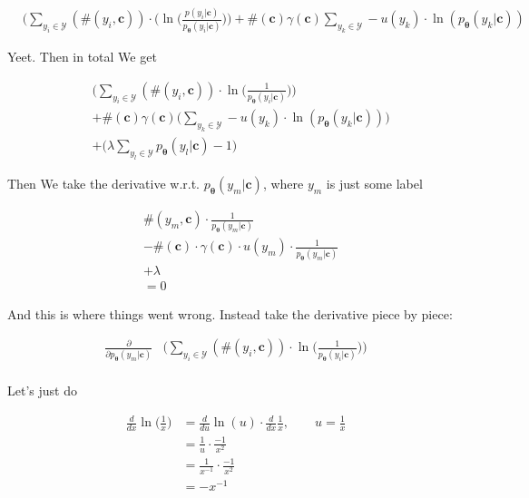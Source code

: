 \documentclass{article}
\newcommand{\vtheta}{\boldsymbol{\theta}}
\newcommand{\model}{p_{\vtheta}}
\newcommand{\context}{\boldsymbol{c}}
\begin{document}
			\begin{align}
				&\bigg(\sum_{y_i\in\mathcal{Y}} (\#(y_i, \context))\cdot \bigg( \ln\bigg(\frac{p(y_i|\context)}{\model(y_i|\context)} \bigg)\bigg) + \#(\context)\gamma(\context)\sum_{y_k\in\mathcal{Y}} - u(y_k)\cdot\ln(\model(y_k|\context)) 
			\end{align}	
			
			Yeet. Then in total We get 
			
			\begin{align}
				&\bigg(\sum_{y_i\in\mathcal{Y}} (\#(y_i, \context))\cdot  \ln\bigg(\frac{1}{\model(y_i|\context)} 	\bigg)\bigg) \\
				&+ \#(\context)\gamma(\context)\bigg(\sum_{y_k\in\mathcal{Y}} - u(y_k)\cdot\ln(\model(y_k|\context))\bigg) \\
				&+ \bigg(\lambda\sum_{y_l\in\mathcal{Y}} \model(y_l|\context) -1\bigg) 
			\end{align}	
			
			Then We take the derivative w.r.t. $\model(y_m|\context)$, where $y_m$ is just some label
			
			\begin{align}
				&\#(y_m, \context)\cdot  \frac{1}{\model(y_m|\context)} 	 \\
				&- \#(\context)\cdot \gamma(\context)\cdot u(y_m)\cdot\frac{1}{\model(y_m|\context)} \\
				&+ \lambda \\
				&=0
			\end{align}	
			
			And this is where things went wrong. Instead take the derivative piece by piece:
			
			\begin{align}
				\frac{\partial}{\partial \model(y_m|\context)} &\bigg(\sum_{y_i\in\mathcal{Y}} (\#(y_i, \context))\cdot  \ln\bigg(\frac{1}{\model(y_i|\context)} 	\bigg)\bigg) \\
			\end{align}
			
			Let's just do
			
			\begin{align}
				\frac{d}{d x} \ln\bigg(\frac{1}{x} \bigg) &= \frac{d}{du}\ln(u)\cdot \frac{d}{dx} \frac{1}{x},\quad\quad u=\frac{1}{x}\\
			&= \frac{1}{u}\cdot \frac{-1}{x^2}\\
			&= \frac{1}{x^{-1}}\cdot \frac{-1}{x^2}\\
			&= -x^{-1}
			\end{align}
			
\end{document}
